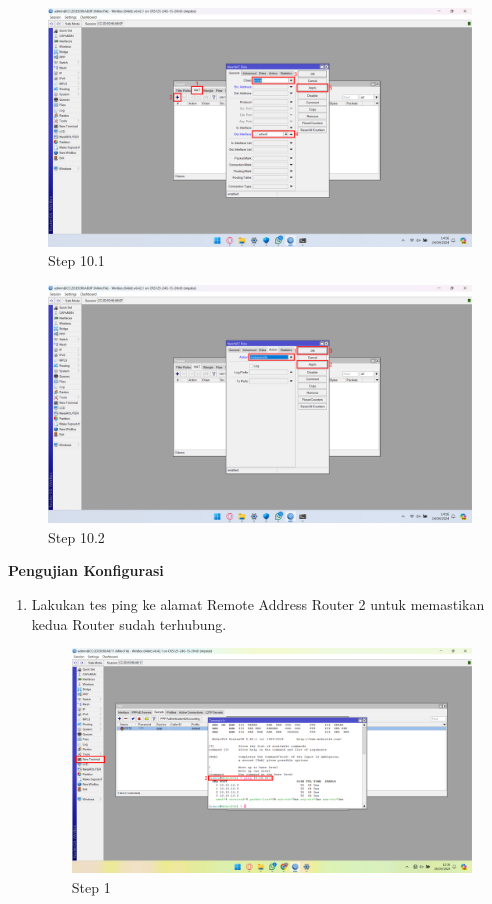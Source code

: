 \begin{center}
\begin{enumerate}
        \begin{figure}[H]
			\centering
			\includegraphics[width=0.5\linewidth]{P4/img/pc1/Step 15.png}
			\caption{Step 10.1}
			\label{fig:Step 10.1(PC 1)}
        \end{figure}
        \begin{figure}[H]
			\centering
			\includegraphics[width=0.8\linewidth]{P4/img/pc1/Step 14.png}
			\caption{Step 10.2}
			\label{fig:Step 10.2(PC 1)}
		\end{figure}	
    \end{enumerate}
	\textbf{Pengujian Konfigurasi}
	\begin{enumerate}
		\item Lakukan tes ping ke alamat Remote Address Router 2 untuk memastikan kedua Router sudah terhubung.
		\begin{figure}[H]
			\centering
			\includegraphics[width=0.8\linewidth]{P4/img/pc1/Step 9.png}
			\caption{Step 1}
			\label{fig:Ping Step 1(PC 1)}
		\end{figure}

\end{enumerate}
\end{center}
